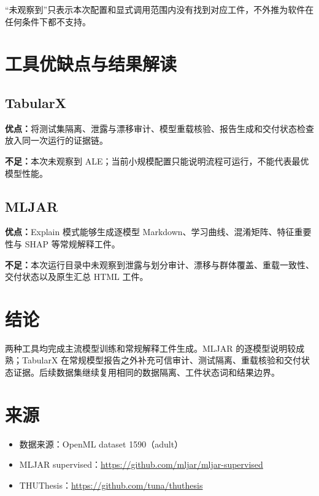 \documentclass[degree=bachelor,language=chinese,fontset=fandol]{thuthesis}
\begin{document}
“未观察到”只表示本次配置和显式调用范围内没有找到对应工件，不外推为软件在任何条件下都不支持。

\chapter{工具优缺点与结果解读}
\section{TabularX}
\textbf{优点：}将测试集隔离、泄露与漂移审计、模型重载核验、报告生成和交付状态检查放入同一次运行的证据链。

\textbf{不足：}本次未观察到 ALE；当前小规模配置只能说明流程可运行，不能代表最优模型性能。

\section{MLJAR}
\textbf{优点：}Explain 模式能够生成逐模型 Markdown、学习曲线、混淆矩阵、特征重要性与 SHAP 等常规解释工件。

\textbf{不足：}本次运行目录中未观察到泄露与划分审计、漂移与群体覆盖、重载一致性、交付状态以及原生汇总 HTML 工件。

\chapter{结论}
两种工具均完成主流模型训练和常规解释工件生成。MLJAR 的逐模型说明较成熟；TabularX 在常规模型报告之外补充可信审计、测试隔离、重载核验和交付状态证据。后续数据集继续复用相同的数据隔离、工件状态词和结果边界。

\backmatter
\chapter{来源}
\begin{itemize}
  \item 数据来源：OpenML dataset 1590（adult）
  \item MLJAR supervised：\url{https://github.com/mljar/mljar-supervised}
  \item THUThesis：\url{https://github.com/tuna/thuthesis}
\end{itemize}
\end{document}
